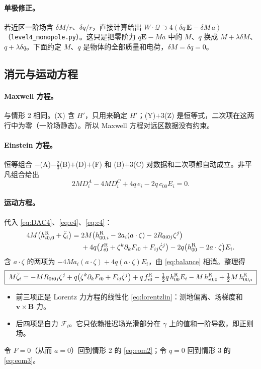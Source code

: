 \documentclass[11pt,a4paper]{ctexart}
\numberwithin{equation}{section}
\begin{document}
\paragraph{单极修正。}若近区一阶场含 $\delta M/r$、$\delta q/r$，直接计算给出 $W\cdot\mathcal Q\supset4(\delta q\,\boldsymbol E-\delta M\,a)$（\texttt{level4\_monopole.py}）。这只是把零阶力 $q\boldsymbol E-Ma$ 中的 $M$、$q$ 换成 $M+\lambda\delta M$、$q+\lambda\delta q$。下面约定 $M$、$q$ 是物体的全部质量和电荷，$\delta M=\delta q=0$。

\subsection{消元与运动方程}
\label{sec:L4eom}

\paragraph{Maxwell 方程。}与情形 2 相同。(X) 含 $H'$，只用来确定 $H'$；(Y)$+3$(Z) 是恒等式，二次项在这两行中为零（一阶场静态）。所以 Maxwell 方程对远区数据没有约束。

\paragraph{Einstein 方程。}恒等组合 $-$(A)$-\tfrac23$(B)$+$(D)$+$(F) 和 (B)$+3$(C) 对数据和二次项都自动成立。非平凡组合给出
\begin{equation}
2MD^A_i-4MD^C_i+4q\,e_i-2q\,c_{00}E_i=0 .
\label{eq:rel4}
\end{equation}

\paragraph{运动方程。}代入 \eqref{eq:DAC4}、\eqref{eq:e4}、\eqref{eq:c4}：
\begin{equation*}
\begin{split}
4M\big(h^{\rm R}_{i0,0}+\ddot\zeta_i\big)={}&2M\big(h^{\rm R}_{00,i}-2a_i(a\cdot\zeta)-2R_{0i0j}\zeta^j\big)\\
&+4q\big(f^{\rm R}_{i0}+\zeta^k\partial_kF_{i0}+F_{ij}\dot\zeta^j\big)-2q\big(h^{\rm R}_{00}-2a\cdot\zeta\big)E_i .
\end{split}
\end{equation*}
含 $a\cdot\zeta$ 的两项为 $-4Ma_i(a\cdot\zeta)+4q(a\cdot\zeta)E_i$，由 \eqref{eq:balance} 相消。整理得
\begin{equation}
\boxed{\;
M\ddot\zeta_i=-MR_{0i0j}\zeta^j+q\big(\zeta^k\partial_kF_{i0}+F_{ij}\dot\zeta^j\big)
+q\,f^{\rm R}_{i0}-\tfrac12q\,h^{\rm R}_{00}E_i-M\,h^{\rm R}_{i0,0}+\tfrac12M\,h^{\rm R}_{00,i}\;}
\label{eq:eom4}
\end{equation}
\begin{itemize}
\item 前三项正是 Lorentz 力方程的线性化 \eqref{eq:lorentzlin}：测地偏离、场梯度和 $\boldsymbol v\times\boldsymbol B$ 力。
\item 后四项是自力 $\mathcal F_i$。它只依赖推迟场光滑部分在 $\gamma$ 上的值和一阶导数，即正则场。
\end{itemize}
令 $F=0$（从而 $a=0$）回到情形 2 的 \eqref{eq:eom2}；令 $q=0$ 回到情形 3 的 \eqref{eq:eom3}。
\end{document}
